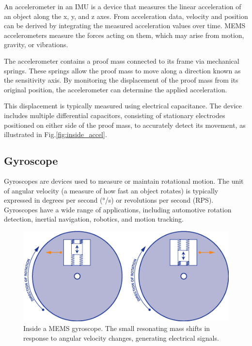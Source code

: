 \documentclass[english, bachelor, utf8]{base/thesis_telematics}
\begin{document}
An accelerometer in an IMU is a device that measures the linear acceleration of an object along the x, y, and z axes. From acceleration data, velocity and position can be derived by integrating the measured acceleration values over time. MEMS accelerometers measure the forces acting on them, which may arise from motion, gravity, or vibrations.

The accelerometer contains a proof mass connected to its frame via mechanical springs. These springs allow the proof mass to move along a direction known as the sensitivity axis. By monitoring the displacement of the proof mass from its original position, the accelerometer can determine the applied acceleration.

This displacement is typically measured using electrical capacitance. The device includes multiple differential capacitors, consisting of stationary electrodes positioned on either side of the proof mass, to accurately detect its movement, as illustrated in Fig.\ref{fig:inside_accel}.

\subsection{Gyroscope}

Gyroscopes are devices used to measure or maintain rotational motion.
The unit of angular velocity (a measure of how fast an object rotates) is typically expressed in degrees per second (°/s) or revolutions per second (RPS). 
Gyroscopes have a wide range of applications, including automotive rotation detection, inertial navigation, robotics, and motion tracking.

\begin{figure}[ht]
\centering
\includegraphics[width=\columnwidth]{pics/inside_gyro.png}
\caption{Inside a MEMS gyroscope. The small resonating mass shifts in response to angular velocity changes, generating electrical signals.}
\label{fig:inside_gyro}
\end{figure}
\end{document}
